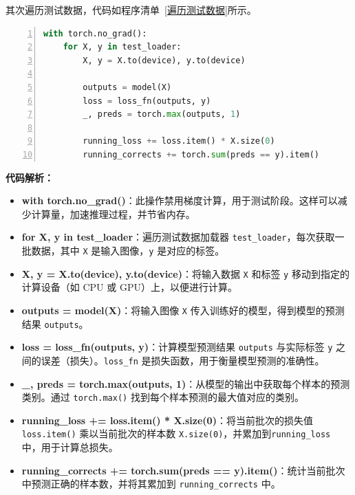 其次遍历测试数据，代码如程序清单~\ref{遍历测试数据}所示。
\begin{lstlisting}[language={python},label={遍历测试数据},caption={遍历测试数据}, basicstyle=\footnotesize\ttfamily, breaklines=true, numbers=left, frame=single]
with torch.no_grad():
    for X, y in test_loader:
        X, y = X.to(device), y.to(device)
        
        outputs = model(X)
        loss = loss_fn(outputs, y)
        _, preds = torch.max(outputs, 1)
        
        running_loss += loss.item() * X.size(0)
        running_corrects += torch.sum(preds == y).item()
\end{lstlisting}
\textbf{代码解析：}
\begin{itemize}
    \item \textbf{with torch.no\_grad()}：此操作禁用梯度计算，用于测试阶段。这样可以减少计算量，加速推理过程，并节省内存。

    \item \textbf{for X, y in test\_loader}：遍历测试数据加载器 \texttt{test\_loader}，每次获取一批数据，其中 \texttt{X} 是输入图像，\texttt{y} 是对应的标签。

    \item \textbf{X, y = X.to(device), y.to(device)}：将输入数据 \texttt{X} 和标签     \texttt{y} 移动到指定的计算设备（如 CPU 或 GPU）上，以便进行计算。

    \item \textbf{outputs = model(X)}：将输入图像 \texttt{X} 传入训练好的模型，得到模型的预测结果 \texttt{outputs}。

    \item \textbf{loss = loss\_fn(outputs, y)}：计算模型预测结果 \texttt{outputs} 与实际标签 \texttt{y} 之间的误差（损失）。\texttt{loss\_fn} 是损失函数，用于衡量模型预测的准确性。

    \item \textbf{\_, preds = torch.max(outputs, 1)}：从模型的输出中获取每个样本的预测类别。通过 \texttt{torch.max()} 找到每个样本预测的最大值对应的类别。

    \item \textbf{running\_loss += loss.item() * X.size(0)}：将当前批次的损失值    \texttt{loss.item()} 乘以当前批次的样本数 \texttt{X.size(0)}，并累加到\texttt{running\_loss} 中，用于计算总损失。

    \item \textbf{running\_corrects += torch.sum(preds == y).item()}：统计当前批次中预测正确的样本数，并将其累加到 \texttt{running\_corrects} 中。

\end{itemize}

